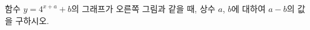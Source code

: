 \noindent\begin{minipage}[t]{0.58\linewidth}\vspace{0pt}\raggedright 함수 $y=4^{x+a}+b$의 그래프가 오른쪽 그림과 같을 때, 상수 $a$, $b$에 대하여 $a-b$의 값을 구하시오.\end{minipage}\hfill\begin{minipage}[t]{0.4\linewidth}\vspace{0pt}\centering \resizebox{\ifdim\width>\linewidth\linewidth\else\width\fi}{!}{}\end{minipage}\par
